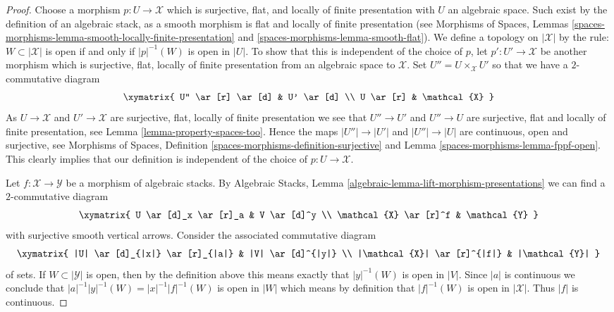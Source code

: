 \begin{proof}
Choose a morphism $p : U \to \mathcal{X}$ which is
surjective, flat, and locally of finite presentation
with $U$ an algebraic space. Such exist by the definition of an algebraic
stack, as a smooth morphism is flat and locally of finite presentation
(see
Morphisms of Spaces,
Lemmas \ref{spaces-morphisms-lemma-smooth-locally-finite-presentation} and
\ref{spaces-morphisms-lemma-smooth-flat}).
We define a topology on $|\mathcal{X}|$ by the rule:
$W \subset |\mathcal{X}|$ is open if and only if $|p|^{-1}(W)$ is open
in $|U|$. To show that this is independent of the choice of $p$, let
$p' : U' \to \mathcal{X}$ be another morphism which is surjective, flat,
locally of finite presentation from an algebraic space to
$\mathcal{X}$. Set $U'' = U \times_\mathcal{X} U'$
so that we have a $2$-commutative diagram
$$
\xymatrix{
U'' \ar[r] \ar[d] & U' \ar[d] \\
U \ar[r] & \mathcal{X}
}
$$
As $U \to \mathcal{X}$ and $U' \to \mathcal{X}$ are surjective, flat,
locally of finite presentation we see that $U'' \to U'$ and $U'' \to U$
are surjective, flat and locally of finite presentation, see
Lemma \ref{lemma-property-spaces-too}.
Hence the maps $|U''| \to |U'|$ and $|U''| \to |U|$ are continuous, open
and surjective, see
Morphisms of Spaces,
Definition \ref{spaces-morphisms-definition-surjective} and
Lemma \ref{spaces-morphisms-lemma-fppf-open}.
This clearly implies that our definition is independent of the choice
of $p : U \to \mathcal{X}$.

\medskip\noindent
Let $f : \mathcal{X} \to \mathcal{Y}$ be a morphism of algebraic stacks.
By
Algebraic Stacks, Lemma \ref{algebraic-lemma-lift-morphism-presentations}
we can find a $2$-commutative diagram
$$
\xymatrix{
U \ar[d]_x \ar[r]_a & V \ar[d]^y \\
\mathcal{X} \ar[r]^f & \mathcal{Y}
}
$$
with surjective smooth vertical arrows.
Consider the associated commutative diagram
$$
\xymatrix{
|U| \ar[d]_{|x|} \ar[r]_{|a|} & |V| \ar[d]^{|y|} \\
|\mathcal{X}| \ar[r]^{|f|} & |\mathcal{Y}|
}
$$
of sets. If $W \subset |\mathcal{Y}|$ is open, then by the definition
above this means exactly that $|y|^{-1}(W)$ is open in $|V|$. Since
$|a|$ is continuous we conclude that
$|a|^{-1}|y|^{-1}(W) = |x|^{-1}|f|^{-1}(W)$ is open in $|W|$ which means
by definition that $|f|^{-1}(W)$ is open in $|\mathcal{X}|$.
Thus $|f|$ is continuous.


\end{proof}
